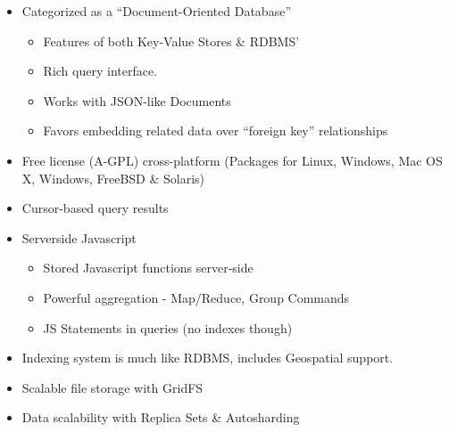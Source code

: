 \documentclass{beamer}
\newenvironment{itemizeframe}
               {\begin{frame}\startitemizeframe} 
               {\stopitemizeframe\end{frame}}
\newcommand\startitemizeframe{\begin{itemize}} \newcommand\stopitemizeframe{\end{itemize}}
\begin{document}
\begin{itemizeframe}
\frametitle{Introducing MongoDB}
    \item Categorized as a ``Document-Oriented Database''
        \begin{itemize}
            \item<2-> Features of both Key-Value Stores \& RDBMS'
            \item<2-> Rich query interface.
            \item<2-> Works with JSON-like Documents
            \item<2-> Favors embedding related data over ``foreign key'' relationships
        \end{itemize}
    \item<3-> Free license (A-GPL) cross-platform (Packages for Linux, Windows, Mac OS X, Windows, FreeBSD \& Solaris)
    \item<4-> Cursor-based query results 
    \item<5-> Serverside Javascript
        \begin{itemize}
            \item<5-> Stored Javascript functions server-side
            \item<5-> Powerful aggregation - Map/Reduce, Group Commands
            \item<5-> JS Statements in queries (no indexes though)
        \end{itemize}
    \item<6-> Indexing system is much like RDBMS, includes Geospatial support.
    \item<7-> Scalable file storage with GridFS
    \item<8-> Data scalability with Replica Sets \& Autosharding
\end{itemizeframe}
\end{document}
